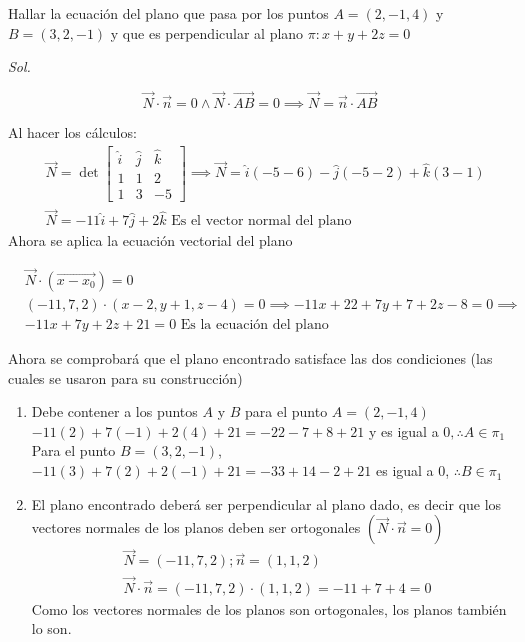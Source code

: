\begin{example}
	Hallar la ecuación del plano que pasa por los puntos $A=(2,-1,4)$ y $B=(3,2,-1)$
	y que es perpendicular al plano $\pi: x+y+2z=0$
\end{example}

\textit{ Sol. }

\begin{equation*}
	\overrightarrow{N}\cdot \overrightarrow{n}=0\land \overrightarrow{N}\cdot \overrightarrow{AB}=0\implies \overrightarrow{N}=\overrightarrow{n}\cdot \overrightarrow{AB}
\end{equation*}

Al hacer los cálculos:
\begin{align*}
	 & \overrightarrow{N}=\det\begin{bmatrix}
		                          \hat{i} & \hat{j} & \hat{k} \\
		                          1       & 1       & 2       \\ 1&3&-5
	                          \end{bmatrix}\implies \overrightarrow{N}=\hat{i}(-5-6)-\hat{j}(-5-2)+\hat{k}(3-1) \\
	 & \overrightarrow{N}=-11\hat{i}+7\hat{j}+2\hat{k}\text{ Es el vector normal del plano}
\end{align*}
Ahora se aplica la ecuación vectorial del plano

\begin{align*}
	 & \overrightarrow{N}\cdot (\overrightarrow{x-x_0})=0                \\
	 & (-11,7,2)\cdot (x-2,y+1,z-4)=0\implies-11x+22+7y+7+2z-8=0\implies \\
	 & -11x+7y+2z+21=0\text{ Es la ecuación del plano}
\end{align*}

Ahora se comprobará que el plano encontrado satisface las dos condiciones (las cuales se usaron para su construcción)

\begin{enumerate}
	\item Debe contener a los puntos $A$ y $B$ para el punto $A=(2,-1,4)$ $-11(2)+7(-1)+2(4)+21=-22-7+8+21$ y es igual a $0,\therefore A\in \pi_1$
	      Para el punto $B=(3,2,-1)$, $-11(3)+7(2)+2(-1)+21=-33+14-2+21$ es igual a 0, $\therefore B\in \pi_1$

	\item El plano encontrado deberá ser perpendicular al plano dado, es decir que los vectores normales de los planos deben ser ortogonales $(\overrightarrow{N}\cdot \overrightarrow{n}=0)$
	      \begin{align*}
		       & \overrightarrow{N}=(-11,7,2); \overrightarrow{n}=(1,1,2)                   \\
		       & \overrightarrow{N}\cdot \overrightarrow{n}=(-11,7,2)\cdot(1,1,2)=-11+7+4=0
	      \end{align*}
	      Como los vectores normales de los planos son ortogonales, los planos también lo son.
\end{enumerate}


